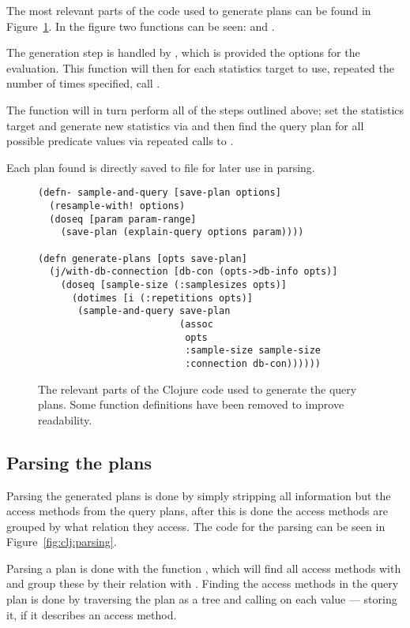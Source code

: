 The most relevant parts of the code used to generate plans can be found in
Figure~\ref{fig:clj:generating}. In the figure two functions can be seen:
 and .

The generation step is handled by , which is provided the
options for the evaluation. This function will then for each statistics target to use,
repeated the number of times specified, call .

The  function will in turn perform all of the steps
outlined above; set the statistics target and generate new statistics via
 and then find the query plan for all possible predicate
values via repeated calls to .

Each plan found is directly saved to file for later use in parsing.

\begin{figure}[ht]
  \begin{verbatim}
(defn- sample-and-query [save-plan options]
  (resample-with! options)
  (doseq [param param-range]
    (save-plan (explain-query options param))))

(defn generate-plans [opts save-plan]
  (j/with-db-connection [db-con (opts->db-info opts)]
    (doseq [sample-size (:samplesizes opts)]
      (dotimes [i (:repetitions opts)]
       (sample-and-query save-plan
                         (assoc
                          opts
                          :sample-size sample-size
                          :connection db-con))))))
   \end{verbatim}
   \caption[The Clojure code to generate all query plans]{The relevant parts of the
     Clojure code used to generate the query plans. Some function definitions
     have been removed to improve readability.}
\label{fig:clj:generating}
\end{figure}

\subsection{Parsing the plans}\label{sec:parsing}
Parsing the generated plans is done by simply stripping all information but the
access methods from the query plans, after this is done the access methods are
grouped by what relation they access. The code for the parsing can be seen in
Figure~\ref{fig:clj:parsing}.

Parsing a plan is done with the function , which will find all
access methods with  and group these by their relation
with . Finding the access methods in the query plan is
done by traversing the plan as a tree and calling 
on each value --- storing it, if it describes an access method.

